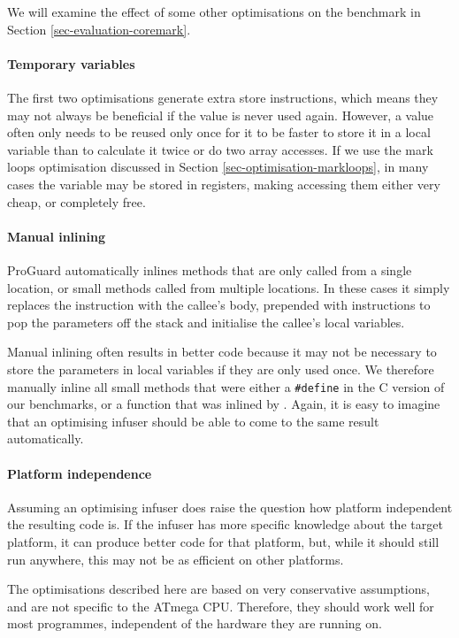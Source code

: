 We will examine the effect of some other optimisations on the  benchmark in Section \ref{sec-evaluation-coremark}.

\paragraph{Temporary variables}
The first two optimisations generate extra store instructions, which means they may not always be beneficial if the value is never used again. However, a value often only needs to be reused only once for it to be faster to store it in a local variable than to calculate it twice or do two array accesses. If we use the mark loops optimisation discussed in Section \ref{sec-optimisation-markloops}, in many cases the variable may be stored in registers, making accessing them either very cheap, or completely free.

\paragraph{Manual inlining}
ProGuard automatically inlines methods that are only called from a single location, or small methods called from multiple locations. In these cases it simply replaces the  instruction with the callee's body, prepended with  instructions to pop the parameters off the stack and initialise the callee's local variables.

Manual inlining often results in better code because it may not be necessary to store the parameters in local variables if they are only used once. We therefore manually inline all small methods that were either a \texttt{\#define} in the C version of our benchmarks, or a function that was inlined by . Again, it is easy to imagine that an optimising infuser should be able to come to the same result automatically.



\paragraph{Platform independence}
Assuming an optimising infuser does raise the question how platform independent the resulting code is. If the infuser has more specific knowledge about the target platform, it can produce better code for that platform, but, while it should still run anywhere, this may not be as efficient on other platforms.

The optimisations described here are based on very conservative assumptions, and are not specific to the ATmega CPU. Therefore, they should work well for most programmes, independent of the hardware they are running on.

